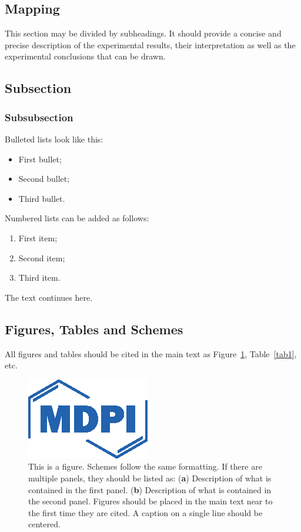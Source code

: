 \documentclass[journal,article,submit,pdftex,moreauthors]{Definitions/mdpi}
\begin{document}
\subsection{Mapping}




This section may be divided by subheadings. It should provide a concise and precise description of the experimental results, their interpretation as well as the experimental conclusions that can be drawn.
\subsection{Subsection}
\subsubsection{Subsubsection}

Bulleted lists look like this:
\begin{itemize}
\item	First bullet;
\item	Second bullet;
\item	Third bullet.
\end{itemize}

Numbered lists can be added as follows:
\begin{enumerate}
\item	First item; 
\item	Second item;
\item	Third item.
\end{enumerate}

The text continues here. 

\subsection{Figures, Tables and Schemes}

All figures and tables should be cited in the main text as Figure~\ref{fig1}, Table~\ref{tab1}, etc.

\begin{figure}[H]
\includegraphics[width=10.5 cm]{Definitions/logo-mdpi}
\caption{This is a figure. Schemes follow the same formatting. If there are multiple panels, they should be listed as: (\textbf{a}) Description of what is contained in the first panel. (\textbf{b}) Description of what is contained in the second panel. Figures should be placed in the main text near to the first time they are cited. A caption on a single line should be centered.\label{fig1}}
\end{figure}   
\unskip
\end{document}
